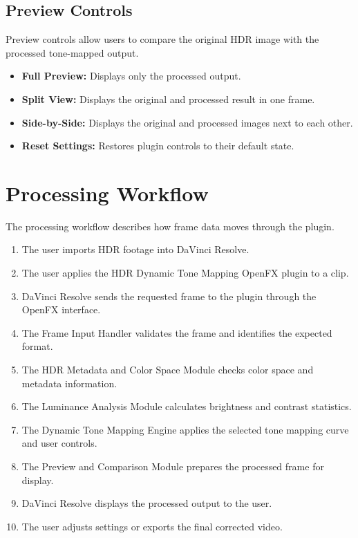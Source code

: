 \documentclass{article}
\begin{document}
\subsection{Preview Controls}
Preview controls allow users to compare the original HDR image with the processed tone-mapped output.

\begin{itemize}
    \item \textbf{Full Preview:} Displays only the processed output.
    \item \textbf{Split View:} Displays the original and processed result in one frame.
    \item \textbf{Side-by-Side:} Displays the original and processed images next to each other.
    \item \textbf{Reset Settings:} Restores plugin controls to their default state.
\end{itemize}

\section{Processing Workflow}

The processing workflow describes how frame data moves through the plugin.

\begin{enumerate}
    \item The user imports HDR footage into DaVinci Resolve.
    \item The user applies the HDR Dynamic Tone Mapping OpenFX plugin to a clip.
    \item DaVinci Resolve sends the requested frame to the plugin through the OpenFX interface.
    \item The Frame Input Handler validates the frame and identifies the expected format.
    \item The HDR Metadata and Color Space Module checks color space and metadata information.
    \item The Luminance Analysis Module calculates brightness and contrast statistics.
    \item The Dynamic Tone Mapping Engine applies the selected tone mapping curve and user controls.
    \item The Preview and Comparison Module prepares the processed frame for display.
    \item DaVinci Resolve displays the processed output to the user.
    \item The user adjusts settings or exports the final corrected video.
\end{enumerate}
\end{document}

